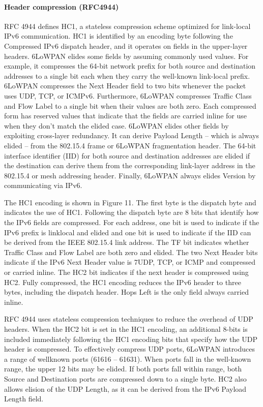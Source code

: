 \paragraph{Header compression (RFC4944)}

RFC 4944 defines HC1,
	a stateless compression scheme optimized for link-local IPv6 communication.
HC1 is identified by an encoding byte following the Compressed IPv6 dispatch header,
	and it operates on fields in the upper-layer headers. 6LoWPAN elides some fields by assuming commonly used values.
For example,
	it compresses the 64-bit network prefix for both source and destination addresses to a single bit each when they carry the well-known link-local prefix. 6LoWPAN compresses the Next Header field to two bits whenever the packet uses UDP,
	TCP,
	or ICMPv6.
Furthermore, 6LoWPAN compresses Traffic Class and Flow Label to a single bit when their values are both zero.
Each compressed form has reserved values that indicate that the fields are carried inline for use when they don’t match the elided case.
6LoWPAN elides other fields by exploiting cross-layer redundancy.
It can derive Payload Length – which is always elided – from the 802.15.4 frame or 6LoWPAN fragmentation header.
The 64-bit interface identifier (IID) for both source and destination addresses are elided if the destination can derive them from the corresponding link-layer address in the 802.15.4 or mesh addressing header.
Finally, 6LoWPAN always elides Version by communicating via IPv6.

The HC1 encoding is shown in Figure 11.
The first byte is the dispatch byte and indicates the use of HC1.
Following the dispatch byte are 8 bits that identify how the IPv6 fields are compressed.
For each address,
	one bit is used to indicate if the IPv6 prefix is linklocal and elided and one bit is used to indicate if the IID can be derived from the IEEE 802.15.4 link address.
The TF bit indicates whether Traffic Class and Flow Label are both zero and elided.
The two Next Header bits indicate if the IPv6 Next Header value is 7UDP,
	TCP,
	or ICMP and compressed or carried inline.
The HC2 bit indicates if the next header is compressed using HC2.
Fully compressed,
	the HC1 encoding reduces the IPv6 header to three bytes,
	including the dispatch header.
Hops Left is the only field always carried inline.


RFC 4944 uses stateless compression techniques to reduce the overhead of UDP headers.
When the HC2 bit is set in the HC1 encoding,
	an additional 8-bits is included immediately following the HC1 encoding bits that specify how the UDP header is compressed.
To effectively compress UDP ports, 6LoWPAN introduces a range of wellknown ports (61616 – 61631).
When ports fall in the well-known range,
	the upper 12 bits may be elided.
If both ports fall within range,
	both Source and Destination ports are compressed down to a single byte.
HC2 also allows elision of the UDP Length,
	as it can be derived from the IPv6 Payload Length field.

